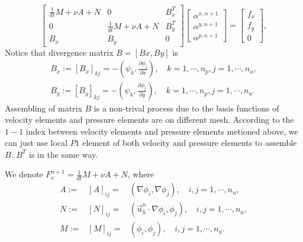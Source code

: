 \documentclass{eajam}
\begin{document}
  \begin{equation}
    \left[
      \begin{array}{lll}
        \frac{1}{dt} M + \nu A + N & 0 & B_x^T \\
        0 & \frac{1}{dt} M +\nu A + N  & B_y^T \\
        B_x & B_y & 0
      \end{array}
    \right]
    \left[
      \begin{array}{c}
        \alpha^{x, n + 1} \\
        \alpha^{y, n + 1} \\
        \alpha^{p, n + 1}
      \end{array}
    \right] = 
    \left[
      \begin{array}{c}
        f_x \\
        f_y \\
        0
      \end{array}
    \right],
    \label{eq::linear_system}
  \end{equation} 
  Notice that divergence matrix $B = [Bx, By]$ is 
  \begin{eqnarray}
    B_x := [B_x]_{kj} = -\left(\psi_k, \frac{\partial \phi_j}{\partial
        x} \right), \quad k = 1, \cdots, n_p, j = 1, \cdots, n_u, \\
    B_y := [B_y]_{kj} = -\left(\psi_k, \frac{\partial \phi_j}{\partial
        y} \right), \quad k = 1, \cdots, n_p, j = 1, \cdots, n_u.
  \end{eqnarray}
  Assembling of matrix $B$ is a non-trival process due to the
  basis functions of velocity elements and pressure elements are on 
  different mesh. According to the $1-1$ index between velocity
  elements and pressure elements metioned above, we can just use local
  $P1$ element of both velocity and pressure elements to assemble $B$.
  $B^T$ is in the same way.
  
  We denote $F_\nu^{n + 1} = \frac{1}{dt} M + \nu A + N$, where
  \begin{eqnarray}
    A := &[A]_{ij} =& \left( \nabla \phi_i, \nabla \phi_j \right),
    \quad i,j = 1, \cdots, n_u, \\
    N := &[N]_{ij} =& \left(\vec{u}_h^n \cdot \nabla \phi_i, \phi_j
    \right), \quad i,j = 1, \cdots, n_u, \\
    M := &[M]_{ij} =& \left( \phi_i, \phi_j \right),\quad  i,j = 1, \cdots,
    n_u.
    \label{eq::mass_matrix}
  \end{eqnarray}
  
\end{document}
